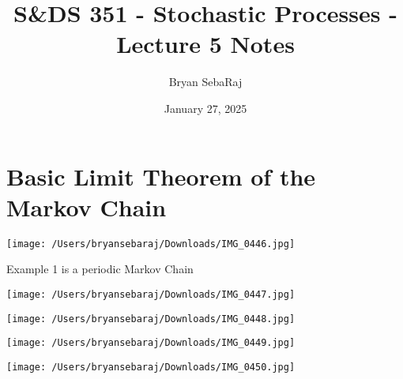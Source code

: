 \documentclass{article}
\title{S\&DS 351 - Stochastic Processes - Lecture 5 Notes}
\author{Bryan SebaRaj}
\date{January 27, 2025}
\begin{document}
\maketitle

\section{Basic Limit Theorem of the Markov Chain}

\texttt{[image: /Users/bryansebaraj/Downloads/IMG\_0446.jpg]}

Example 1 is a periodic Markov Chain

 \texttt{[image: /Users/bryansebaraj/Downloads/IMG\_0447.jpg]}

 \texttt{[image: /Users/bryansebaraj/Downloads/IMG\_0448.jpg]}

 \texttt{[image: /Users/bryansebaraj/Downloads/IMG\_0449.jpg]}

 \texttt{[image: /Users/bryansebaraj/Downloads/IMG\_0450.jpg]}






\end{document}
